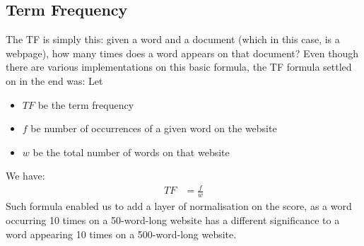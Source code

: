 \subsection{Term Frequency}
The TF is simply this: given a word and a document (which in this case, is a webpage), how many times does a word appears on that document? \citep{luhn1957statistical} \newline
Even though there are various implementations on this basic formula, the TF formula settled on in the end was:\newline
Let
\begin{itemize}
    \item $TF$ be the term frequency
    \item $f$ be number of occurrences of a given word on the website
    \item $w$ be the total number of words on that website
\end{itemize}
We have:
\begin{align}
    TF &= \frac{f}{w}
    \label{eq:TF}
\end{align}
Such formula enabled us to add a layer of normalisation on the score, as a word occurring 10 times on a 50-word-long website has a different significance to a word appearing 10 times on a 500-word-long website.

